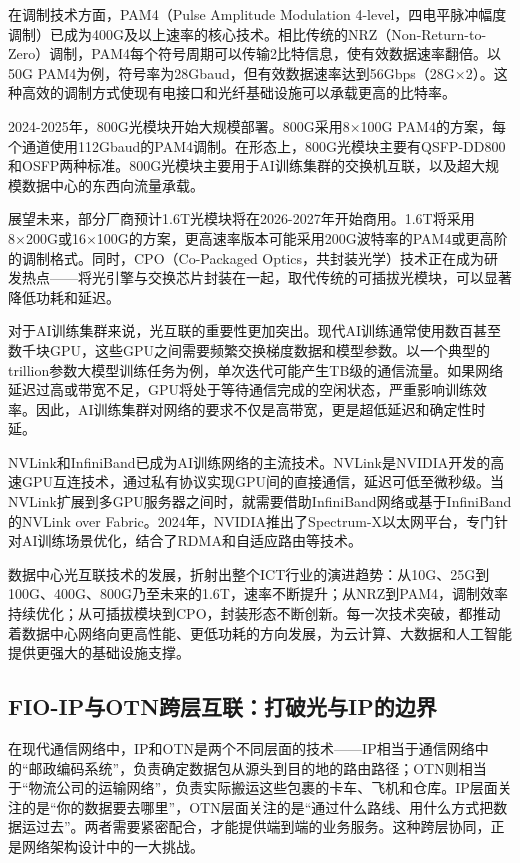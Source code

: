 在调制技术方面，PAM4（Pulse Amplitude Modulation 4-level，四电平脉冲幅度调制）已成为400G及以上速率的核心技术。相比传统的NRZ（Non-Return-to-Zero）调制，PAM4每个符号周期可以传输2比特信息，使有效数据速率翻倍。以50G PAM4为例，符号率为28Gbaud，但有效数据速率达到56Gbps（28G×2）。这种高效的调制方式使现有电接口和光纤基础设施可以承载更高的比特率。

2024-2025年，800G光模块开始大规模部署。800G采用8×100G PAM4的方案，每个通道使用112Gbaud的PAM4调制。在形态上，800G光模块主要有QSFP-DD800和OSFP两种标准。800G光模块主要用于AI训练集群的交换机互联，以及超大规模数据中心的东西向流量承载。

展望未来，部分厂商预计1.6T光模块将在2026-2027年开始商用。1.6T将采用8×200G或16×100G的方案，更高速率版本可能采用200G波特率的PAM4或更高阶的调制格式。同时，CPO（Co-Packaged Optics，共封装光学）技术正在成为研发热点——将光引擎与交换芯片封装在一起，取代传统的可插拔光模块，可以显著降低功耗和延迟。

对于AI训练集群来说，光互联的重要性更加突出。现代AI训练通常使用数百甚至数千块GPU，这些GPU之间需要频繁交换梯度数据和模型参数。以一个典型的 trillion参数大模型训练任务为例，单次迭代可能产生TB级的通信流量。如果网络延迟过高或带宽不足，GPU将处于等待通信完成的空闲状态，严重影响训练效率。因此，AI训练集群对网络的要求不仅是高带宽，更是超低延迟和确定性时延。

NVLink和InfiniBand已成为AI训练网络的主流技术。NVLink是NVIDIA开发的高速GPU互连技术，通过私有协议实现GPU间的直接通信，延迟可低至微秒级。当NVLink扩展到多GPU服务器之间时，就需要借助InfiniBand网络或基于InfiniBand的NVLink over Fabric。2024年，NVIDIA推出了Spectrum-X以太网平台，专门针对AI训练场景优化，结合了RDMA和自适应路由等技术。

数据中心光互联技术的发展，折射出整个ICT行业的演进趋势：从10G、25G到100G、400G、800G乃至未来的1.6T，速率不断提升；从NRZ到PAM4，调制效率持续优化；从可插拔模块到CPO，封装形态不断创新。每一次技术突破，都推动着数据中心网络向更高性能、更低功耗的方向发展，为云计算、大数据和人工智能提供更强大的基础设施支撑。

\subsection{FIO-IP与OTN跨层互联：打破光与IP的边界}

在现代通信网络中，IP和OTN是两个不同层面的技术——IP相当于通信网络中的“邮政编码系统”，负责确定数据包从源头到目的地的路由路径；OTN则相当于“物流公司的运输网络”，负责实际搬运这些包裹的卡车、飞机和仓库。IP层面关注的是“你的数据要去哪里”，OTN层面关注的是“通过什么路线、用什么方式把数据运过去”。两者需要紧密配合，才能提供端到端的业务服务。这种跨层协同，正是网络架构设计中的一大挑战。

